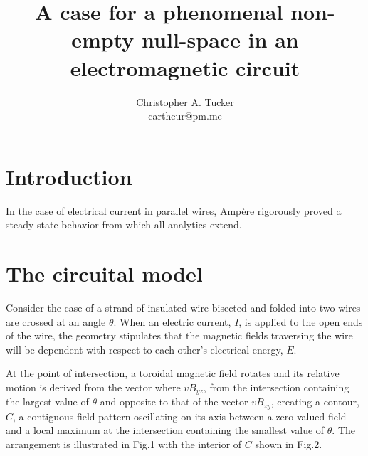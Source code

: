 \documentclass[]{article}
\begin{document}
\title{A case for a phenomenal non-empty null-space in an electromagnetic circuit}

\author{Christopher A. Tucker\\cartheur@pm.me\\}


\maketitle


\section{Introduction}
In the case of electrical current in parallel wires, Amp\`ere rigorously proved a steady-state behavior from which all analytics extend. 

\section{The circuital model}
Consider the case of a strand of insulated wire bisected and folded into two wires are crossed at an angle $\theta$. When an electric current, $I$, is applied to the open ends of the wire, the geometry stipulates that the magnetic fields traversing the wire will be dependent with respect to each other's electrical energy, $E$.

At the point of intersection, a toroidal magnetic field rotates and its relative motion is derived from the vector where $v{{B}_{yz}}$, from the intersection containing the largest value of $\theta$ and opposite to that of the vector $v{{B}_{zy}}$, creating a contour, $C$, a contiguous field pattern oscillating on its axis between a zero-valued field and a local maximum at the intersection containing the smallest value of $\theta$. The arrangement is illustrated in Fig.1 with the interior of $C$ shown in Fig.2.
\end{document}

